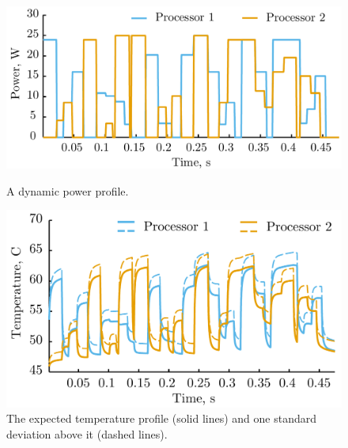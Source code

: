 \begin{figure}[rt]
  \vspace{-1.0em}
  \centering
  \includegraphics[width=1\columnwidth]{include/assets/power.pdf}
  \caption{A dynamic power profile.}
  \vspace{0.5em}
  \includegraphics[width=1\columnwidth]{include/assets/temperature.pdf}
  \caption{The expected temperature profile (solid lines) and one standard deviation above it (dashed lines).}
  \vspace{-1.5em}
\end{figure}
